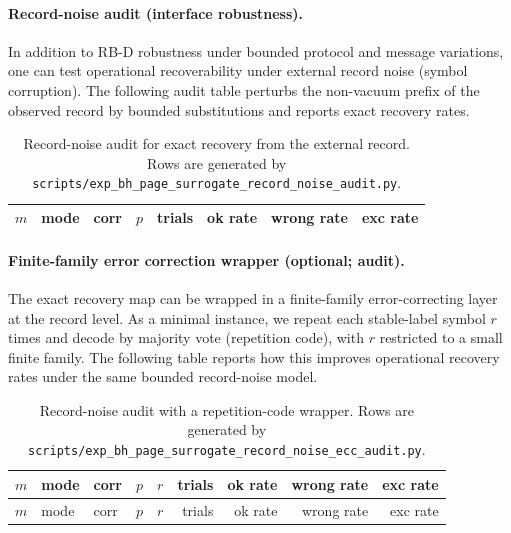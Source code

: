 \paragraph{Record-noise audit (interface robustness).}
\AuditTag In addition to RB-D robustness under bounded protocol and message variations, one can test operational
recoverability under external record noise (symbol corruption). The following audit table perturbs the non-vacuum
prefix of the observed record by bounded substitutions and reports exact recovery rates.

\begin{table}[t]
\centering
\scriptsize
\setlength{\tabcolsep}{6pt}
\renewcommand{\arraystretch}{1.15}
\begin{tabular}{r l l r r r r r}
\toprule
$m$ & mode & corr & $p$ & trials & ok rate & wrong rate & exc rate \\
\midrule
%
\end{tabular}
\caption{Record-noise audit for exact recovery from the external record. Rows are generated by \texttt{scripts/exp\_bh\_page\_surrogate\_record\_noise\_audit.py}.}
\label{tab:bh_page_record_noise_audit}
\end{table}

%

\paragraph{Finite-family error correction wrapper (optional; audit).}
\AuditTag The exact recovery map can be wrapped in a finite-family error-correcting layer at the record level.
As a minimal instance, we repeat each stable-label symbol $r$ times and decode by majority vote (repetition code),
with $r$ restricted to a small finite family. The following table reports how this improves operational recovery
rates under the same bounded record-noise model.

\begingroup
\scriptsize
\setlength{\tabcolsep}{6pt}
\renewcommand{\arraystretch}{1.15}
\begin{longtable}{r l l r r r r r r}
\caption{Record-noise audit with a repetition-code wrapper. Rows are generated by \texttt{scripts/exp\_bh\_page\_surrogate\_record\_noise\_ecc\_audit.py}.}
\label{tab:bh_page_record_noise_ecc_audit}\\
\toprule
$m$ & mode & corr & $p$ & $r$ & trials & ok rate & wrong rate & exc rate \\
\midrule
\endfirsthead
\toprule
$m$ & mode & corr & $p$ & $r$ & trials & ok rate & wrong rate & exc rate \\
\midrule
\endhead
%
\end{longtable}
\endgroup

